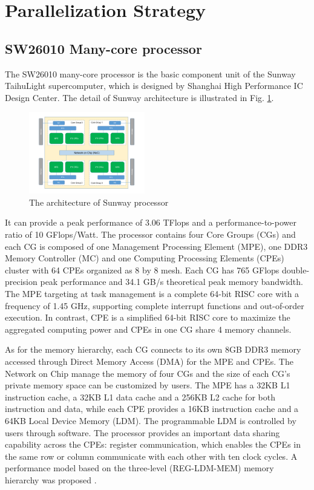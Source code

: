 \documentclass[5p,times]{elsarticle}
\begin{document}
\section{Parallelization Strategy}
\label{sec:parallel}

\subsection{SW26010 Many-core processor}

The SW26010 many-core processor is the basic component unit of the Sunway TaihuLight supercomputer, which is designed by Shanghai High Performance IC Design Center. The detail of Sunway architecture is illustrated in Fig. \ref{sw26010}.
\begin{figure}[htbp]
\centerline{\includegraphics[width=0.45\textwidth]{sw26010.pdf}}
\caption{The architecture of Sunway processor}
\label{sw26010}
\end{figure}
It can provide a peak performance of 3.06 TFlops and a performance-to-power ratio of 10 GFlops/Watt. The processor contains four Core Groups (CGs) and each CG is composed of one Management Processing Element (MPE), one DDR3 Memory Controller (MC) and one Computing Processing Elements (CPEs) cluster with 64 CPEs organized as 8 by 8 mesh. Each CG has 765 GFlops double-precision peak performance and 34.1 GB/s theoretical peak memory bandwidth. The MPE targeting at task management is a complete 64-bit RISC core with a frequency of 1.45 GHz, supporting complete interrupt functions and out-of-order execution. In contrast, CPE is a simplified 64-bit RISC core to maximize the aggregated computing power and CPEs in one CG share 4 memory channels.

As for the memory hierarchy, each CG connects to its own 8GB DDR3 memory accessed through Direct Memory Access (DMA) for the MPE and CPEs. The Network on Chip manage the memory of four CGs and the size of each CG's private memory space can be customized by users. The MPE has a 32KB L1 instruction cache, a 32KB L1 data cache and a 256KB L2 cache for both instruction and data, while each CPE provides a 16KB instruction cache and a 64KB Local Device Memory (LDM). The programmable LDM is controlled by users through software. The processor provides an important data sharing capability across the CPEs: register communication, which enables the CPEs in the same row or column communicate with each other with ten clock cycles. A performance model based on the three-level (REG-LDM-MEM) memory hierarchy was proposed \cite{b16}.
\end{document}
